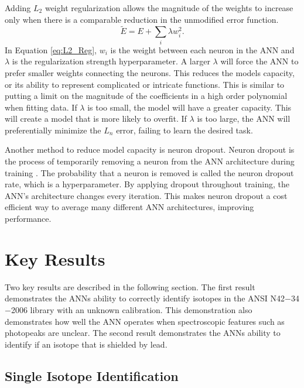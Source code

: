 \documentclass[tocnosub,noragright,centerchapter,12pt,fullpage]{uiucecethesis09}
\begin{document}
Adding $L_2$ weight regularization allows the magnitude of the weights to increase only when there is a comparable reduction in the unmodified error function.
%
\begin{equation} \label{eq:L2_Reg}
\tilde{E} = E + \sum_i \lambda w_i^2.
\end{equation}
%
In Equation \ref{eq:L2_Reg}, $w_i$ is the weight between each neuron in the ANN and $\lambda$ is the regularization strength hyperparameter. A larger $\lambda$ will force the ANN to prefer smaller weights connecting the neurons. This reduces the models capacity, or its ability to represent complicated or intricate functions. This is similar to putting a limit on the magnitude of the coefficients in a high order polynomial when fitting data. If $\lambda$ is too small, the model will have a greater capacity. This will create a model that is more likely to overfit. If $\lambda$ is too large, the ANN will preferentially minimize the $L_n$ error, failing to learn the desired task.

Another method to reduce model capacity is neuron dropout. Neuron dropout is the process of temporarily removing a neuron from the ANN architecture during training \cite{Srivastava2014}. The probability that a neuron is removed is called the neuron dropout rate, which is a hyperparameter. By applying dropout throughout training, the ANN's architecture changes every iteration. This makes neuron dropout a cost efficient way to average many different ANN architectures, improving performance.



\section{Key Results}

Two key results are described in the following section. The first result demonstrates the ANNs ability to correctly identify isotopes in the ANSI N42$-$34$-$2006 library with an unknown calibration. This demonstration also demonstrates how well the ANN operates when spectroscopic features such as photopeaks are unclear. The second result demonstrates the ANNs ability to identify if an isotope that is shielded by lead.  

\subsection{Single Isotope Identification}
\end{document}
